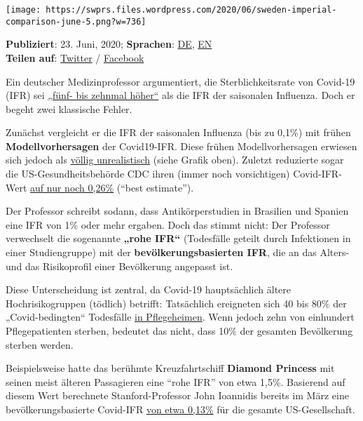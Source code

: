 \texttt{[image: https://swprs.files.wordpress.com/2020/06/sweden-imperial-comparison-june-5.png?w=736]}

\textbf{Publiziert}: 23. Juni, 2020; \textbf{Sprachen}:
\href{https://swprs.org/covid-19-letalitat-wie-man-es-nicht-macht/}{DE},
\href{https://swprs.org/covid19-lethality-how-not-to-do-it/}{EN}\\
\textbf{Teilen auf}:
\href{https://twitter.com/intent/tweet?url=https://swprs.org/covid-19-letalitat-wie-man-es-nicht-macht/}{Twitter}
/
\href{https://www.facebook.com/share.php?u=https://swprs.org/covid-19-letalitat-wie-man-es-nicht-macht/}{Facebook}

Ein deutscher Medizinprofessor argumentiert, die Sterblichkeitsrate von
Covid-19 (IFR) sei
\href{https://www.heise.de/tp/features/Wie-gefaehrlich-ist-Covid-19-im-Vergleich-zur-saisonalen-Grippe-4790313.html}{„fünf-
bis zehnmal höher``} als die IFR der saisonalen Influenza. Doch er
begeht zwei klassische Fehler.

Zunächst vergleicht er die IFR der saisonalen Influenza (bis zu 0,1\%)
mit frühen \textbf{Modell­vor­hersagen} der Covid19-IFR. Diese frühen
Modellvorhersagen erwiesen sich jedoch als
\href{https://swprs.org/studies-on-covid-19-lethality/}{völlig
unrealistisch} (siehe Grafik oben). Zuletzt reduzierte sogar die
US-Gesund­heits­behörde CDC ihren (immer noch vorsichtigen)
Covid-IFR-Wert
\href{https://www.cdc.gov/coronavirus/2019-ncov/hcp/planning-scenarios.html}{auf
nur noch 0,26\%} (``best estimate'').

Der Professor schreibt sodann, dass Antikörperstudien in Brasilien und
Spanien eine IFR von 1\% oder mehr ergaben. Doch das stimmt nicht: Der
Professor verwechselt die sogenannte \textbf{„rohe IFR``} (Todesfälle
geteilt durch Infektionen in einer Studiengruppe) mit der
\textbf{bevölkerungs­basierten IFR}, die an das Alters- und das
Risikoprofil einer Bevölkerung angepasst ist.

Diese Unterscheidung ist zentral, da Covid-19 hauptsächlich ältere
Hochrisikogruppen (tödlich) betrifft: Tatsächlich ereigneten sich 40 bis
80\% der „Covid-bedingten`` Todesfälle
\href{https://swprs.org/studies-on-covid-19-lethality/\#care-homes}{in
Pflegeheimen}. Wenn jedoch zehn von einhundert Pflegepatienten sterben,
bedeutet das nicht, dass 10\% der gesamten Bevölkerung sterben werden.

Beispielsweise hatte das berühmte Kreuzfahrtschiff \textbf{Diamond
Princess} mit seinen meist älteren Passagieren eine ``rohe IFR'' von
etwa 1,5\%. Basierend auf diesem Wert berechnete Stanford-Professor John
Ioannidis bereits im März eine bevölkerungs­basierte Covid-IFR
\href{https://www.statnews.com/2020/03/17/a-fiasco-in-the-making-as-the-coronavirus-pandemic-takes-hold-we-are-making-decisions-without-reliable-data/}{von
etwa 0,13\%} für die gesamte US-Gesellschaft.

